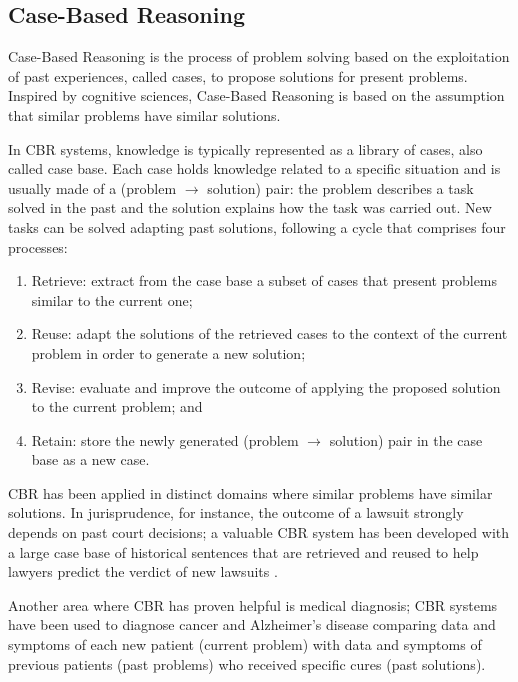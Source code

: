 \subsection{Case-Based Reasoning} %
\label{sub:case_based_reasoning_approaches}


Case-Based Reasoning \cite{Kolodner93,Aamodt94,LopezDeMantaras05} is the process of problem solving based on the exploitation of past experiences, called cases, to propose solutions for present problems. 
Inspired by cognitive sciences, Case-Based Reasoning is based on the assumption that similar problems have similar solutions. 

In CBR systems, knowledge is typically represented as a library of cases, also called case base.
Each case holds knowledge related to a specific situation and is usually made of a (problem $\rightarrow$ solution) pair: the problem describes a task solved in the past and the solution explains how the task was carried out. 
New tasks can be solved adapting past solutions, following a cycle that comprises four processes: 
\begin{enumerate}
  \item Retrieve: extract from the case base a subset of cases that present problems similar to the current one;
  \item Reuse: adapt the solutions of the retrieved cases to the context of the current problem in order to generate a new solution;
  \item Revise: evaluate and improve the outcome of applying the proposed solution to the current problem; and
  \item Retain: store the newly generated (problem $\rightarrow$ solution) pair in the case base as a new case.
\end{enumerate}

CBR has been applied in distinct domains where similar problems have similar solutions. %
In jurisprudence, for instance, the outcome of a lawsuit strongly depends on past court decisions; a valuable CBR system has been developed with a large case base of historical sentences that are retrieved and reused to help lawyers predict the verdict of new lawsuits \cite{Weber97}.

Another area where CBR has proven helpful is medical diagnosis; CBR systems have been used to diagnose cancer \cite{Diaz06} and Alzheimer's disease \cite{Marling01} comparing data and symptoms of each new patient (current problem) with data and symptoms of previous patients (past problems) who received specific cures (past solutions).

